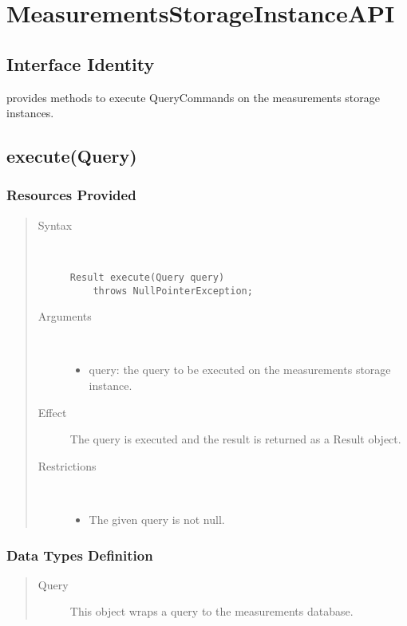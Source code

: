 \section{MeasurementsStorageInstanceAPI}

\subsection{Interface Identity}

\npar {} provides methods to execute
QueryCommands on the measurements storage instances.

\subsection{execute(Query)}

\subsubsection{Resources Provided}

\begin{quote}
	\begin{description}
		\item[Syntax] \ 
		\begin{verbatim}
Result execute(Query query) 
    throws NullPointerException;
		\end{verbatim}
		\item[Arguments] \
		\begin{itemize}
			\item query: the query to be executed on the measurements storage instance. 
		\end{itemize}
		\item[Effect] The query is executed and the result is returned as a Result
		object.
		\item[Restrictions] \ 
		\begin{itemize}
			\item The given query is not null.
		\end{itemize}
	\end{description} 
\end{quote}

\subsubsection{Data Types Definition}

\begin{quote}
	\begin{description}
		\item[Query] This object wraps a query to the measurements database.
	\end{description} 
\end{quote}

